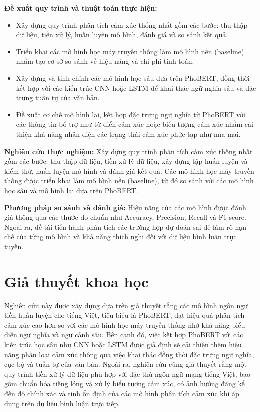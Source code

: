 \documentclass[14pt, a4paper]{report}
\begin{document}
\textbf{Đề xuất quy trình và thuật toán thực hiện:}

\begin{itemize}
    \item Xây dựng quy trình phân tích cảm xúc thống nhất gồm các bước: thu thập dữ liệu, tiền xử lý, huấn luyện mô hình, đánh giá và so sánh kết quả.
    \item Triển khai các mô hình học máy truyền thống làm mô hình nền (baseline) nhằm tạo cơ sở so sánh về hiệu năng và chi phí tính toán.
    \item Xây dựng và tinh chỉnh các mô hình học sâu dựa trên PhoBERT, đồng thời kết hợp với các kiến trúc CNN hoặc LSTM để khai thác ngữ nghĩa sâu và đặc trưng tuần tự của văn bản.
    \item Đề xuất cơ chế mô hình lai, kết hợp đặc trưng ngữ nghĩa từ PhoBERT với các thông tin bổ trợ như từ điển cảm xúc hoặc biểu tượng cảm xúc nhằm cải thiện khả năng nhận diện các trạng thái cảm xúc phức tạp như mỉa mai.
\end{itemize}

\textbf{Nghiên cứu thực nghiệm:} Xây dựng quy trình phân tích cảm xúc thống nhất gồm các bước: thu thập dữ liệu, tiền xử lý dữ liệu, xây dựng tập huấn luyện và kiểm thử, huấn luyện mô hình và đánh giá kết quả. Các mô hình học máy truyền thống được triển khai làm mô hình nền (baseline), từ đó so sánh với các mô hình học sâu và mô hình lai dựa trên PhoBERT.

\textbf{Phương pháp so sánh và đánh giá:} Hiệu năng của các mô hình được đánh giá thông qua các thước đo chuẩn như Accuracy, Precision, Recall và F1-score. Ngoài ra, đề tài tiến hành phân tích các trường hợp dự đoán sai để làm rõ hạn chế của từng mô hình và khả năng thích nghi đối với dữ liệu bình luận trực tuyến.

\section{Giả thuyết khoa học}

Nghiên cứu này được xây dựng dựa trên giả thuyết rằng các mô hình ngôn ngữ tiền huấn luyện cho tiếng Việt, tiêu biểu là PhoBERT, đạt hiệu quả phân tích cảm xúc cao hơn so với các mô hình học máy truyền thống nhờ khả năng biểu diễn ngữ nghĩa và ngữ cảnh sâu. Bên cạnh đó, việc kết hợp PhoBERT với các kiến trúc học sâu như CNN hoặc LSTM được giả định sẽ cải thiện thêm hiệu năng phân loại cảm xúc thông qua việc khai thác đồng thời đặc trưng ngữ nghĩa, cục bộ và tuần tự của văn bản. Ngoài ra, nghiên cứu cũng giả thuyết rằng một quy trình tiền xử lý dữ liệu phù hợp với đặc thù ngôn ngữ mạng tiếng Việt, bao gồm chuẩn hóa tiếng lóng và xử lý biểu tượng cảm xúc, có ảnh hưởng đáng kể đến độ chính xác và tính ổn định của các mô hình phân tích cảm xúc khi áp dụng trên dữ liệu bình luận trực tiếp.
\end{document}
